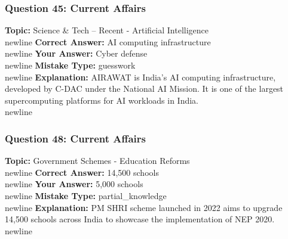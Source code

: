 \documentclass[a4paper,12pt]{article}
\begin{document}
\subsubsection{Question 45: Current Affairs}
\textbf{Topic:} Science \& Tech – Recent - Artificial Intelligence\\newline
\textbf{Correct Answer:} AI computing infrastructure\\newline
\textbf{Your Answer:} \textcolor{wrongred}{Cyber defense}\\newline
\textbf{Mistake Type:} guesswork\\newline
\textbf{Explanation:} AIRAWAT is India's AI computing infrastructure, developed by C-DAC under the National AI Mission. It is one of the largest supercomputing platforms for AI workloads in India.\\newline
\vspace{0.5cm}
\subsubsection{Question 48: Current Affairs}
\textbf{Topic:} Government Schemes - Education Reforms\\newline
\textbf{Correct Answer:} 14,500 schools\\newline
\textbf{Your Answer:} \textcolor{wrongred}{5,000 schools}\\newline
\textbf{Mistake Type:} partial\_knowledge\\newline
\textbf{Explanation:} PM SHRI scheme launched in 2022 aims to upgrade 14,500 schools across India to showcase the implementation of NEP 2020.\\newline
\vspace{0.5cm}
\end{document}
